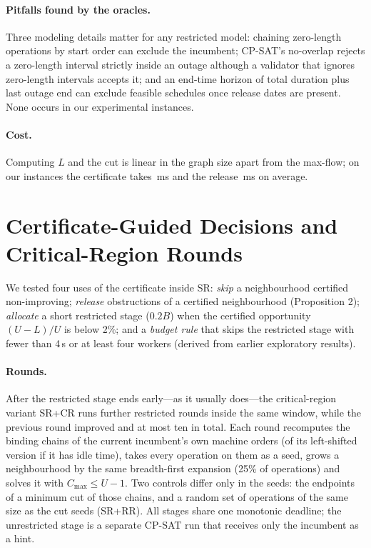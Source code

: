 \documentclass[letterpaper]{article} %
\newcommand{\base}{\textsc{SR}}
\newcommand{\crm}{\textsc{SR+CR}}
\newcommand{\rr}{\textsc{SR+RR}}
\begin{document}
\paragraph{Pitfalls found by the oracles.} Three modeling details matter for any restricted model: chaining zero-length operations by start order can exclude the incumbent; CP-SAT's no-overlap rejects a zero-length interval strictly inside an outage although a validator that ignores zero-length intervals accepts it; and an end-time horizon of total duration plus last outage end can exclude feasible schedules once release dates are present. None occurs in our experimental instances.

\paragraph{Cost.} Computing $L$ and the cut is linear in the graph size apart from the max-flow; on our instances the certificate takes \PilotCertMs\,ms and the release \PilotReleaseMs\,ms on average.

\section{Certificate-Guided Decisions and Critical-Region Rounds}

We tested four uses of the certificate inside \base: \emph{skip} a neighbourhood certified non-improving; \emph{release} obstructions of a certified neighbourhood (Proposition 2); \emph{allocate} a short restricted stage ($0.2B$) when the certified opportunity $(U-L)/U$ is below 2\%; and a \emph{budget rule} that skips the restricted stage with fewer than 4\,s or at least four workers (derived from earlier exploratory results).

\paragraph{Rounds.} After the restricted stage ends early---as it usually does---the critical-region variant \crm{} runs further restricted rounds inside the same window, while the previous round improved and at most ten in total. Each round recomputes the binding chains of the current incumbent's own machine orders (of its left-shifted version if it has idle time), takes every operation on them as a seed, grows a neighbourhood by the same breadth-first expansion (25\% of operations) and solves it with $C_{\max}\le U-1$. Two controls differ only in the seeds: the endpoints of a minimum cut of those chains, and a random set of operations of the same size as the cut seeds (\rr). All stages share one monotonic deadline; the unrestricted stage is a separate CP-SAT run that receives only the incumbent as a hint.
\end{document}
